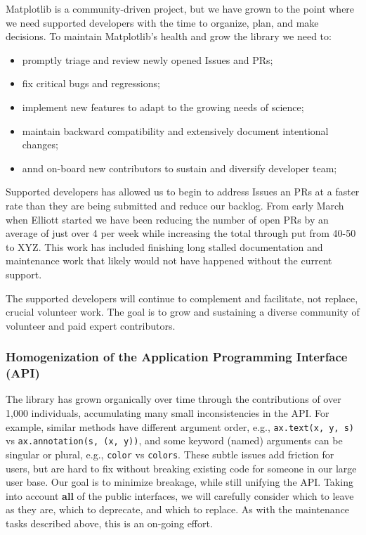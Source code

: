 \documentclass[12pt,letterpaper]{article}  %
\begin{document}
Matplotlib is a community-driven project, but we have grown to the
point where we need supported developers with the time to organize,
plan, and make decisions.  To maintain Matplotlib's health and grow
the library we need to:

\begin{itemize}[noitemsep]
\item promptly triage and review newly opened Issues and PRs;
\item fix critical bugs and regressions;
\item implement new features to adapt to the growing needs of science;
\item maintain backward compatibility and extensively document intentional changes;
\item annd on-board new contributors to sustain and diversify developer team;
\end{itemize}

Supported developers has allowed us to begin to address Issues an PRs
at a faster rate than they are being submitted and reduce our backlog.
From early March when Elliott started we have been reducing the number
of open PRs by an average of just over 4 per week while increasing the
total through put from 40-50 to XYZ.  This work has included finishing
long stalled documentation and maintenance work that likely would not
have happened without the current support.

The supported developers will continue to complement and facilitate,
not replace, crucial volunteer work.  The goal is to grow and
sustaining a diverse community of volunteer and paid expert
contributors.

\subsubsection{Homogenization of the Application Programming Interface (API)}
\label{sec:api_hom}

The library has grown organically over time through the contributions
of over 1,000 individuals, accumulating many small inconsistencies in
the API.  For example, similar methods have different argument order,
e.g., \texttt{ax.text(x, y, s)} vs \texttt{ax.annotation(s, (x, y))},
and some keyword (named) arguments can be singular or plural, e.g.,
\texttt{color} vs \texttt{colors}.  These subtle issues add friction
for users, but are hard to fix without breaking existing code for
someone in our large user base.  Our goal is to minimize breakage,
while still unifying the API. Taking into account \textbf{all} of the
public interfaces, we will carefully consider which to leave as they
are, which to deprecate, and which to replace.  As with the maintenance
tasks described above, this is an on-going effort.
\end{document}
